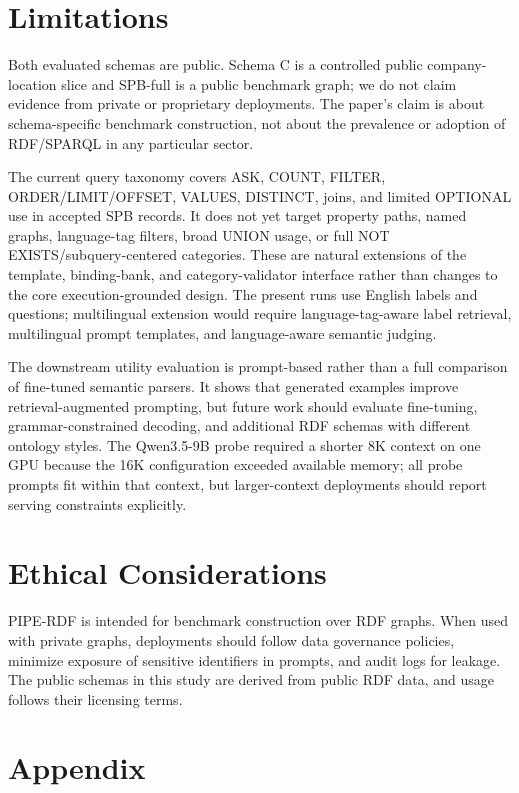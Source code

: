 \documentclass[11pt]{article}
\begin{document}
\section{Limitations}
\label{sec:limitations}
Both evaluated schemas are public. Schema C is a controlled public company-location slice and SPB-full is a public benchmark graph; we do not claim evidence from private or proprietary deployments. The paper's claim is about schema-specific benchmark construction, not about the prevalence or adoption of RDF/SPARQL in any particular sector.

The current query taxonomy covers ASK, COUNT, FILTER, ORDER/LIMIT/OFFSET, VALUES, DISTINCT, joins, and limited OPTIONAL use in accepted SPB records. It does not yet target property paths, named graphs, language-tag filters, broad UNION usage, or full NOT EXISTS/subquery-centered categories. These are natural extensions of the template, binding-bank, and category-validator interface rather than changes to the core execution-grounded design. The present runs use English labels and questions; multilingual extension would require language-tag-aware label retrieval, multilingual prompt templates, and language-aware semantic judging.

The downstream utility evaluation is prompt-based rather than a full comparison of fine-tuned semantic parsers. It shows that generated examples improve retrieval-augmented prompting, but future work should evaluate fine-tuning, grammar-constrained decoding, and additional RDF schemas with different ontology styles. The Qwen3.5-9B probe required a shorter 8K context on one GPU because the 16K configuration exceeded available memory; all probe prompts fit within that context, but larger-context deployments should report serving constraints explicitly.

\section{Ethical Considerations}
\label{sec:ethical}
PIPE-RDF is intended for benchmark construction over RDF graphs. When used with private graphs, deployments should follow data governance policies, minimize exposure of sensitive identifiers in prompts, and audit logs for leakage. The public schemas in this study are derived from public RDF data, and usage follows their licensing terms.



\appendix
\section*{Appendix}
\end{document}
